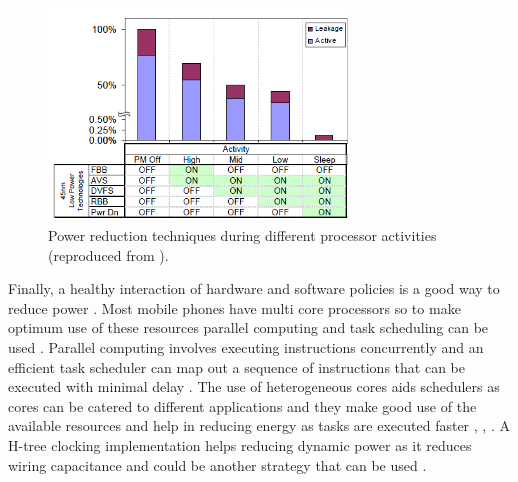 \documentclass[journal]{IEEEtran}
\begin{document}
	\begin{figure}[h]
	   \centering
	   \includegraphics[width = 8cm]{ABBTech}
	   \caption{Power reduction techniques during different processor activities (reproduced from \cite{ABB}).}
	   \label{Figure:ABBTech}
	\end{figure}	
	\FloatBarrier

Finally, a healthy interaction of hardware and software policies is a good way to reduce power \cite{HD/SF}. Most mobile phones have multi core processors so to make optimum use of these resources parallel computing and task scheduling can be used \cite{HD/SF}. Parallel computing involves executing instructions concurrently and an efficient task scheduler can map out a sequence of instructions that can be executed with minimal delay \cite{HD/SF}. The use of heterogeneous cores aids schedulers as cores can be catered to different applications and they make good use of the available resources and help in reducing energy as tasks are executed faster \cite{HD/SF}, \cite{MultiCores}, \cite{Heterogeneous}. A H-tree clocking implementation helps reducing dynamic power as it reduces wiring capacitance and could be another strategy that can be used \cite{Heterogeneous}.
\end{document}
